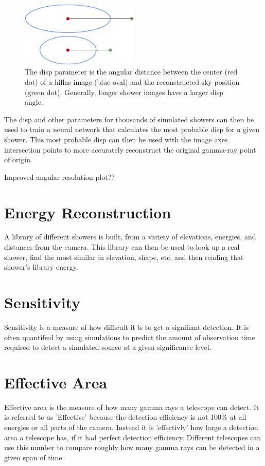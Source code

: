 \begin{figure}[h]
  \begin{center}
    \includegraphics[width=0.5\textwidth]{images/thesis.dispdiagram.eps}
    \caption[Angular Reconstruction Disp]{The disp parameter is the angular distance between the center (red dot) of a hillas image (blue oval) and the reconstructed sky position (green dot).  Generally, longer shower images have a larger disp angle.}\label{fig:dispdiagram}
  \end{center}
\end{figure}

The disp and other parameters for thousands of simulated showers can then be used to train a neural network that calculates the most probable disp for a given shower.
This most probable disp can then be used with the image axes intersection points to more accurately reconstruct the original gamma-ray point of origin.

Improved angular resolution plot??

\section{Energy Reconstruction}\label{subsec:enrecon}
A library of different showers is built, from a variety of elevations, energies, and distances from the camera.
This library can then be used to look up a real shower, find the most similar in elevation, shape, etc, and then reading that shower's library energy.


\section{Sensitivity}
Sensitivity is a measure of how difficult it is to get a signifiant detection.
It is often quantified by using simulations to predict the amount of observation time required to detect a simulated source at a given significance level.


\section{Effective Area}
Effective area is the measure of how many gamma rays a telescope can detect.
It is referred to as 'Effective' because the detection efficiency is not 100\% at all energies or all parts of the camera.
Instead it is 'effectivly' how large a detection area a telescope has, if it had perfect detection efficiency.
Different telescopes can use this number to compare roughly how many gamma rays can be detected in a given span of time.


